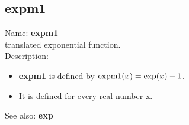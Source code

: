 \subsection{ expm1 }
\noindent Name: \textbf{expm1}\\
translated exponential function.\\

\noindent Description: \begin{itemize}

\item \textbf{expm1} is defined by ${\rm expm1}(x) = \exp(x)-1$.

\item It is defined for every real number x.
\end{itemize}
See also: \textbf{exp}
